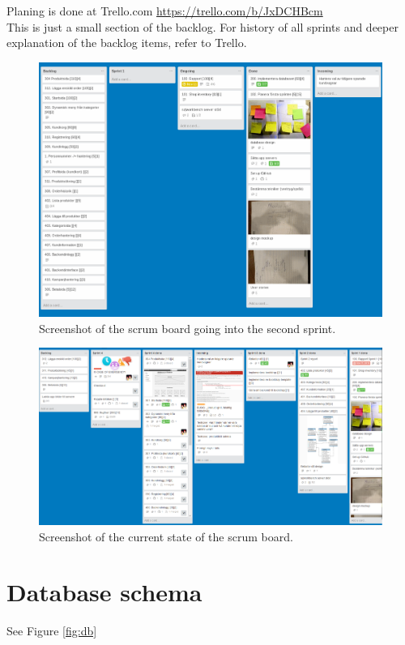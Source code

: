 \documentclass[paper=a4, fontsize=11pt]{report} %
\begin{document}
\begin{itemize}
	Planing is done at Trello.com
	\url{https://trello.com/b/JxDCHBcm} \\
	This is just a small section of the backlog. For history of all sprints and deeper
	explanation of the backlog items, refer to Trello.


	\begin{figure}[h]
		\includegraphics[width=\textwidth]{artifacts/trello_sprint1.png}
		\caption{Screenshot of the scrum board going into the second sprint.}
		\label{fig:trello_sprint1}
	\end{figure}

	\begin{figure}[h]
		\includegraphics[width=\textwidth]{artifacts/trello_final.png}
		\caption{Screenshot of the current state of the scrum board.}
		\label{fig:trello_final}
	\end{figure}

\section*{Database schema}
See Figure \ref{fig:db}


\end{itemize}
\end{document}
